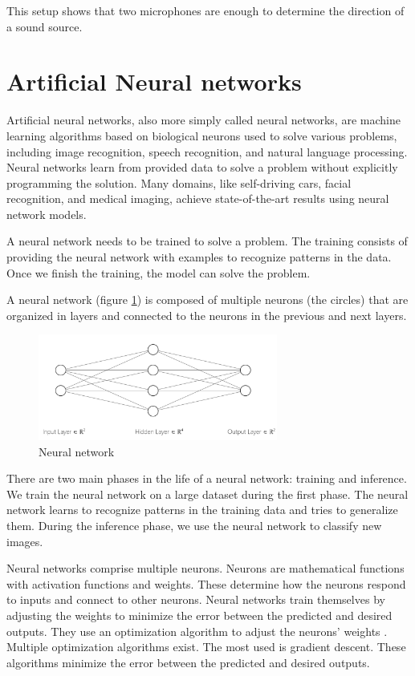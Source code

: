 This setup shows that two microphones are enough to determine the direction of a sound source.

\section{Artificial Neural networks}

Artificial neural networks, also more simply called neural networks, are machine learning algorithms based on biological neurons used to solve various problems, including image recognition, speech recognition, and natural language processing. Neural networks learn from provided data to solve a problem without explicitly programming the solution. Many domains, like self-driving cars, facial recognition, and medical imaging, achieve state-of-the-art results using neural network models. 

A neural network needs to be trained to solve a problem. The training consists of providing the neural network with examples to recognize patterns in the data. Once we finish the training, the model can solve the problem.

A neural network (figure \ref*{fig:neural_network}) is composed of multiple neurons (the circles) that are organized in layers and connected to the neurons in the previous and next layers. 

\begin{figure}[H]
    \centering
    \includegraphics[width=0.7\textwidth]{../Images/neural_network_example.png}
    \caption{Neural network}
    \label{fig:neural_network}
\end{figure}

There are two main phases in the life of a neural network: training and inference. We train the neural network on a large dataset during the first phase. The neural network learns to recognize patterns in the training data and tries to generalize them. During the inference phase, we use the neural network to classify new images.

Neural networks comprise multiple neurons. Neurons are mathematical functions with activation functions and weights. These determine how the neurons respond to inputs and connect to other neurons. Neural networks train themselves by adjusting the weights to minimize the error between the predicted and desired outputs. They use an optimization algorithm to adjust the neurons' weights \cite{sun2019optimization}. Multiple optimization algorithms exist. The most used is gradient descent\cite{zhang2019gradient}. These algorithms minimize the error between the predicted and desired outputs.

